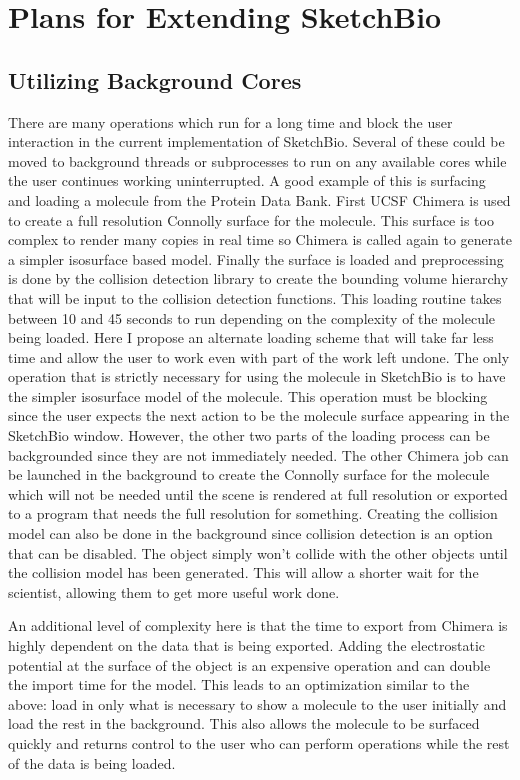 \documentclass{article} %
\begin{document}
\section{Plans for Extending SketchBio}
\subsection{Utilizing Background Cores}
There are many operations which run for a long time and block the user interaction in the current implementation of SketchBio.  Several of these could be moved to background threads or subprocesses to run on any available cores while the user continues working uninterrupted.  A good example of this is surfacing and loading a molecule from the Protein Data Bank.  First UCSF Chimera is used to create a full resolution Connolly surface for the molecule.  This surface is too complex to render many copies in real time so Chimera is called again to generate a simpler isosurface based model.  Finally the surface is loaded and preprocessing is done by the collision detection library to create the bounding volume hierarchy that will be input to the collision detection functions.  This loading routine takes between 10 and 45 seconds to run depending on the complexity of the molecule being loaded.  Here I propose an alternate loading scheme that will take far less time and allow the user to work even with part of the work left undone.  The only operation that is strictly necessary for using the molecule in SketchBio is to have the simpler isosurface model of the molecule.  This operation must be blocking since the user expects the next action to be the molecule surface appearing in the SketchBio window.  However, the other two parts of the loading process can be backgrounded since they are not immediately needed.  The other Chimera job can be launched in the background to create the Connolly surface for the molecule which will not be needed until the scene is rendered at full resolution or exported to a program that needs the full resolution for something.  Creating the collision model can also be done in the background since collision detection is an option that can be disabled.  The object simply won’t collide with the other objects until the collision model has been generated.  This will allow a shorter wait for the scientist, allowing them to get more useful work done.

An additional level of complexity here is that the time to export from Chimera is highly dependent on the data that is being exported.  Adding the electrostatic potential at the surface of the object is an expensive operation and can double the import time for the model.  This leads to an optimization similar to the above: load in only what is necessary to show a molecule to the user initially and load the rest in the background.  This also allows the molecule to be surfaced quickly and returns control to the user who can perform operations while the rest of the data is being loaded.
\end{document}
